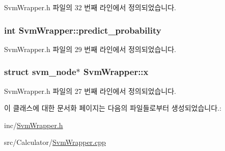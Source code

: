 Svm\+Wrapper.\+h 파일의 32 번째 라인에서 정의되었습니다.

\hypertarget{class_svm_wrapper_a18cae78dd4b43d0dc1f2e4d2446b3568}{
\subsubsection[{predict\+\_\+probability}]{\setlength{\rightskip}{0pt plus 5cm}int Svm\+Wrapper\+::predict\+\_\+probability\hspace{0.3cm}{\ttfamily [private]}}}\label{class_svm_wrapper_a18cae78dd4b43d0dc1f2e4d2446b3568}


Svm\+Wrapper.\+h 파일의 29 번째 라인에서 정의되었습니다.

\hypertarget{class_svm_wrapper_abf0dcde4c2d3ec163b487fdf6cc883bc}{
\subsubsection[{x}]{\setlength{\rightskip}{0pt plus 5cm}struct {\bf svm\+\_\+node}$\ast$ Svm\+Wrapper\+::x\hspace{0.3cm}{\ttfamily [private]}}}\label{class_svm_wrapper_abf0dcde4c2d3ec163b487fdf6cc883bc}


Svm\+Wrapper.\+h 파일의 27 번째 라인에서 정의되었습니다.



이 클래스에 대한 문서화 페이지는 다음의 파일들로부터 생성되었습니다.\+:\begin{DoxyCompactItemize}
\item 
inc/\hyperlink{_svm_wrapper_8h}{Svm\+Wrapper.\+h}\item 
src/\+Calculator/\hyperlink{_svm_wrapper_8cpp}{Svm\+Wrapper.\+cpp}\end{DoxyCompactItemize}
